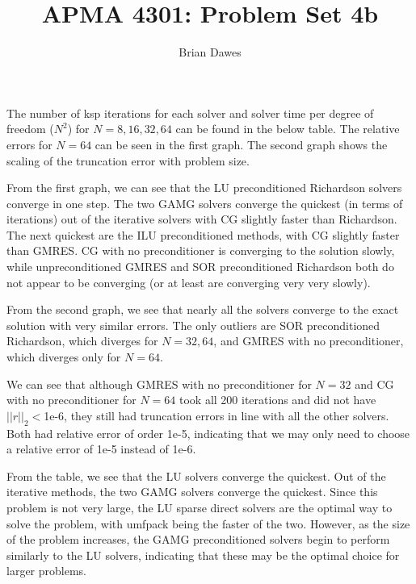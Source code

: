 \documentclass{article}\usepackage[T1]{fontenc}
\begin{document}
\title{APMA 4301: Problem Set 4b}
\author{Brian Dawes}
\maketitle

The number of ksp iterations for each solver and solver time per degree of freedom ($N^2$) for $N=8,16,32,64$ can be found in the below table. The relative errors for $N=64$ can be seen in the first graph. The second graph shows the scaling of the truncation error with problem size.

From the first graph, we can see that the LU preconditioned Richardson solvers converge in one step. The two GAMG solvers converge the quickest (in terms of iterations) out of the iterative solvers with CG slightly faster than Richardson. The next quickest are the ILU preconditioned methods, with CG slightly faster than GMRES. CG with no preconditioner is converging to the solution slowly, while unpreconditioned GMRES and SOR preconditioned Richardson both do not appear to be converging (or at least are converging very very slowly).

From the second graph, we see that nearly all the solvers converge to the exact solution with very similar errors. The only outliers are SOR preconditioned Richardson, which diverges for $N=32,64$, and GMRES with no preconditioner, which diverges only for $N=64$.

We can see that although GMRES with no preconditioner for $N=32$ and CG with no preconditioner for $N=64$ took all 200 iterations and did not have $||r||_2<$1e-6, they still had truncation errors in line with all the other solvers. Both had relative error of order 1e-5, indicating that we may only need to choose a relative error of 1e-5 instead of 1e-6.

From the table, we see that the LU solvers converge the quickest. Out of the iterative methods, the two GAMG solvers converge the quickest. Since this problem is not very large, the LU sparse direct solvers are the optimal way to solve the problem, with umfpack being the faster of the two. However, as the size of the problem increases, the GAMG preconditioned solvers begin to perform similarly to the LU solvers, indicating that these may be the optimal choice for larger problems.
 
\end{document}
